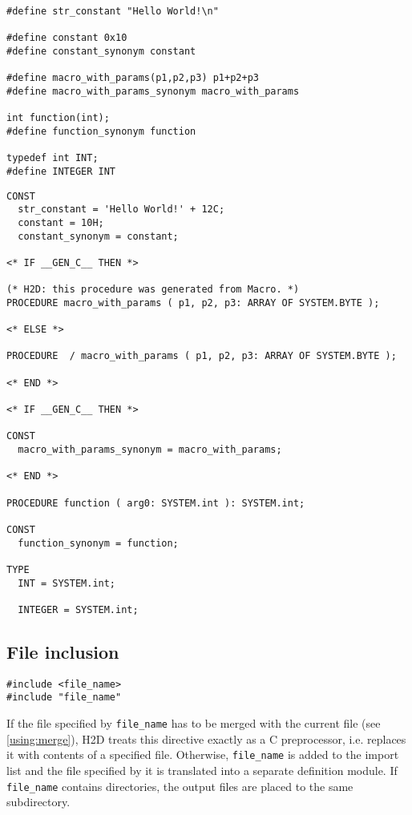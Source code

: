 {\ifonline\else\small\fi
\begin{verbatim}
#define str_constant "Hello World!\n"

#define constant 0x10
#define constant_synonym constant

#define macro_with_params(p1,p2,p3) p1+p2+p3
#define macro_with_params_synonym macro_with_params

int function(int);
#define function_synonym function

typedef int INT;
#define INTEGER INT
\end{verbatim}

\Sep %

\begin{verbatim}
CONST
  str_constant = 'Hello World!' + 12C;
  constant = 10H;
  constant_synonym = constant;

<* IF __GEN_C__ THEN *>

(* H2D: this procedure was generated from Macro. *)
PROCEDURE macro_with_params ( p1, p2, p3: ARRAY OF SYSTEM.BYTE );

<* ELSE *>

PROCEDURE  / macro_with_params ( p1, p2, p3: ARRAY OF SYSTEM.BYTE );

<* END *>

<* IF __GEN_C__ THEN *>

CONST
  macro_with_params_synonym = macro_with_params;

<* END *>

PROCEDURE function ( arg0: SYSTEM.int ): SYSTEM.int;

CONST
  function_synonym = function;

TYPE
  INT = SYSTEM.int;

  INTEGER = SYSTEM.int;
\end{verbatim}
} %

\subsection{File inclusion}
\label{rules:pp:include}

\begin{verbatim}
#include <file_name>
#include "file_name"
\end{verbatim}

If the file specified by {\tt file\_name} has to be merged with the current file
(see \ref{using:merge}), H2D treats this directive exactly as a C preprocessor,
i.e. replaces it with contents of a specified file. Otherwise,
{\tt file\_name} is added to the import list and the file specified by it is
translated into a separate definition module. If \verb'file_name' contains
directories, the output files are placed to the same subdirectory.

